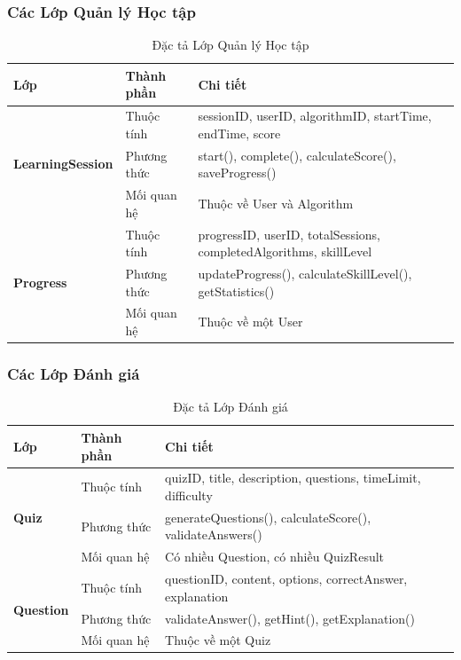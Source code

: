 \subsubsection{Các Lớp Quản lý Học tập}

\begin{table}[H]
\centering
\caption{Đặc tả Lớp Quản lý Học tập}
\label{tab:learning-classes}
\begin{tabular}{|p{2.5cm}|p{4.5cm}|p{6cm}|}
\hline
\textbf{Lớp} & \textbf{Thành phần} & \textbf{Chi tiết} \\
\hline
\multirow{3}{2.5cm}{\textbf{LearningSession}} 
& Thuộc tính & sessionID, userID, algorithmID, startTime, endTime, score \\
\cline{2-3}
& Phương thức & start(), complete(), calculateScore(), saveProgress() \\
\cline{2-3}
& Mối quan hệ & Thuộc về User và Algorithm \\
\hline
\multirow{3}{2.5cm}{\textbf{Progress}} 
& Thuộc tính & progressID, userID, totalSessions, completedAlgorithms, skillLevel \\
\cline{2-3}
& Phương thức & updateProgress(), calculateSkillLevel(), getStatistics() \\
\cline{2-3}
& Mối quan hệ & Thuộc về một User \\
\hline
\end{tabular}
\end{table}

\subsubsection{Các Lớp Đánh giá}

\begin{table}[H]
\centering
\caption{Đặc tả Lớp Đánh giá}
\label{tab:assessment-classes}
\begin{tabular}{|p{2cm}|p{5cm}|p{6cm}|}
\hline
\textbf{Lớp} & \textbf{Thành phần} & \textbf{Chi tiết} \\
\hline
\multirow{3}{2cm}{\textbf{Quiz}} 
& Thuộc tính & quizID, title, description, questions, timeLimit, difficulty \\
\cline{2-3}
& Phương thức & generateQuestions(), calculateScore(), validateAnswers() \\
\cline{2-3}
& Mối quan hệ & Có nhiều Question, có nhiều QuizResult \\
\hline
\multirow{3}{2cm}{\textbf{Question}} 
& Thuộc tính & questionID, content, options, correctAnswer, explanation \\
\cline{2-3}
& Phương thức & validateAnswer(), getHint(), getExplanation() \\
\cline{2-3}
& Mối quan hệ & Thuộc về một Quiz \\
\hline
\end{tabular}
\end{table}

